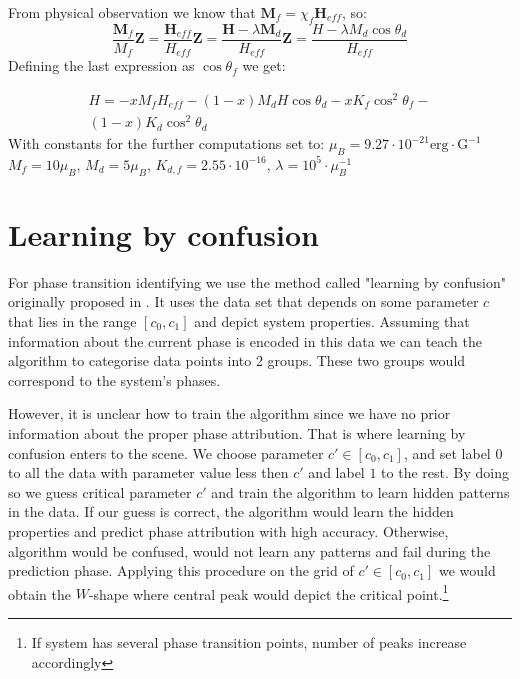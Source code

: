 From physical observation we know that $\bm{M}_f = \chi_f \bm{H}_{eff}$, so:
\begin{equation}
    \frac{\bm{M}_f}{M_f}\bm{Z} =
    \frac{\bm{H}_{eff}}{H_{eff}}\bm{Z} =
    \frac{\bm{H} - \lambda\bm{M}_d}{H_{eff}}\bm{Z}=
    \frac{H - \lambda M_d \cos\theta_d}{H_{eff}}
\end{equation}
Defining the last expression as $\cos\theta_f$ we get:

\begin{multline}
    H = -xM_fH_{eff} -
    (1-x)M_dH\cos\theta_d -
    xK_f\cos^2\theta_f -\\
    (1-x)K_d\cos^2\theta_d
\end{multline}
With constants for the further computations set to:
    $\mu_{B} = 9.27\cdot10^{-21} \mathrm{erg}\cdot \mathrm{G}^{-1}$
    $M_{f}=10 \mu_{B}$,
    $M_{d}=5 \mu_{B}$,
    $K_{d,f} = 2.55 \cdot 10^{-16}$,
    $\lambda = 10^5 \cdot \mu_{B}^{-1}$


\section{Learning by confusion}
For phase transition identifying we use the method called "learning by confusion" originally proposed in \cite{VanNieuwenburg2017}.
It uses the data set that depends on some parameter $c$ that lies in the range $[c_0, c_1]$ and depict system properties.
Assuming that information about the current phase is encoded in this data we can teach the algorithm to categorise data points into 2 groups.
These two groups would correspond to the system's phases.

However, it is unclear how to train the algorithm since we have no prior information about the proper phase attribution.
That is where learning by confusion enters to the scene.
We choose parameter $c'\in[c_0, c_1]$, and set label $0$ to all the data with parameter value less then $c'$ and label $1$ to the rest.
By doing so we guess critical parameter $c'$ and train the algorithm to learn hidden patterns in the data.
If our guess is correct, the algorithm would learn the hidden properties and predict phase attribution with high accuracy.
Otherwise, algorithm would be confused, would not learn any patterns and fail during the prediction phase.
Applying this procedure on the grid of $c'\in[c_0, c_1]$ we would obtain the $W$-shape where central peak would depict the critical point.\footnote{If system has several phase transition points, number of peaks increase accordingly}

